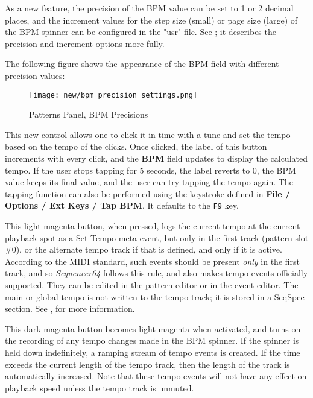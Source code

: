    As a new feature, the precision of the BPM value can be set to 1 or 2
   decimal places, and the increment values for the step size (small)
   or page size (large) of the BPM spinner can be configured in the "usr" file.
   See ; it describes
   the precision and increment options more fully.

   The following figure shows the appearance of the BPM field with different
   precision values:

\begin{figure}[H]
   \centering 
   \texttt{[image: new/bpm\_precision\_settings.png]}
   \caption{Patterns Panel, BPM Precisions}
   \label{fig:pattern_window_bpm_precision_settings.png}
\end{figure}

   This new control allows one to click it in time with a tune and set the
   tempo based on the tempo of the clicks.  Once clicked, the label of this
   button increments with every click, and the \textbf{BPM} field updates to
   display the calculated tempo.  If the user stops tapping for 5 seconds, the
   label reverts to 0, the BPM value keeps its final value, and the user can
   try tapping the tempo again.
   The tapping  function can also be performed using the keystroke defined
   in \textbf{File / Options / Ext Keys / Tap BPM}.  It defaults
   to the \texttt{F9} key.

   This light-magenta button, when pressed, logs the current tempo at the
   current playback spot as a Set Tempo meta-event, but only in the first
   track (pattern slot \#0), or the alternate tempo track if that is defined,
   and only if it is active.  According to the MIDI standard, such events
   should be present \textsl{only} in the first track,
   and so \textsl{Sequencer64} follows this rule, and also makes tempo events
   officially supported.  They can be edited in the pattern editor or in the
   event editor.
   The main or global tempo is not written to the tempo track; it is stored in
   a SeqSpec section.
   See , for more information.

   This dark-magenta button becomes light-magenta when activated, and turns on
   the recording of any tempo changes made in the BPM spinner.  If the spinner
   is held down indefinitely, a ramping stream of tempo events is created.  If
   the time exceeds the current length of the tempo track, then the length of
   the track is automatically increased.
   Note that these tempo events will not have any effect on playback speed
   unless the tempo track is unmuted.

